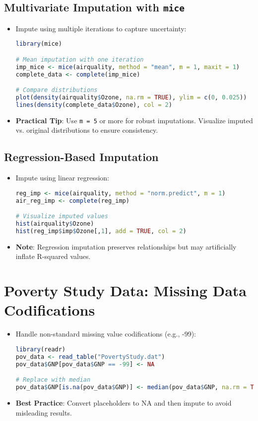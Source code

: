 \documentclass{article}
\begin{document}
\subsection{Multivariate Imputation with \texttt{mice}}
\begin{itemize}
    \item Impute using multiple iterations to capture uncertainty:
\begin{lstlisting}[language=R]
library(mice)

# Mean imputation with one iteration
imp_mice <- mice(airquality, method = "mean", m = 1, maxit = 1)
complete_data <- complete(imp_mice)

# Compare distributions
plot(density(airquality$Ozone, na.rm = TRUE), ylim = c(0, 0.025))
lines(density(complete_data$Ozone), col = 2)
\end{lstlisting}

\item \textbf{Practical Tip}: Use \texttt{m = 5} or more for robust imputations. Visualize imputed vs. original distributions to ensure consistency.
\end{itemize}

\subsection{Regression-Based Imputation}
\begin{itemize}
    \item Impute using linear regression:
\begin{lstlisting}[language=R]
reg_imp <- mice(airquality, method = "norm.predict", m = 1)
air_reg_imp <- complete(reg_imp)

# Visualize imputed values
hist(airquality$Ozone)
hist(reg_imp$imp$Ozone[,1], add = TRUE, col = 2)
\end{lstlisting}

\item \textbf{Note}: Regression imputation preserves relationships but may artificially inflate R-squared values.
\end{itemize}

\section{Poverty Study Data: Missing Data Codifications}
\begin{itemize}
    \item Handle non-standard missing value codifications (e.g., -99):
\begin{lstlisting}[language=R]
library(readr)
pov_data <- read_table("PovertyStudy.dat")
pov_data$GNP[pov_data$GNP == -99] <- NA

# Replace with median
pov_data$GNP[is.na(pov_data$GNP)] <- median(pov_data$GNP, na.rm = TRUE)
\end{lstlisting}

\item \textbf{Best Practice}: Convert placeholders to NA and then impute to avoid misleading results.
\end{itemize}
\end{document}

